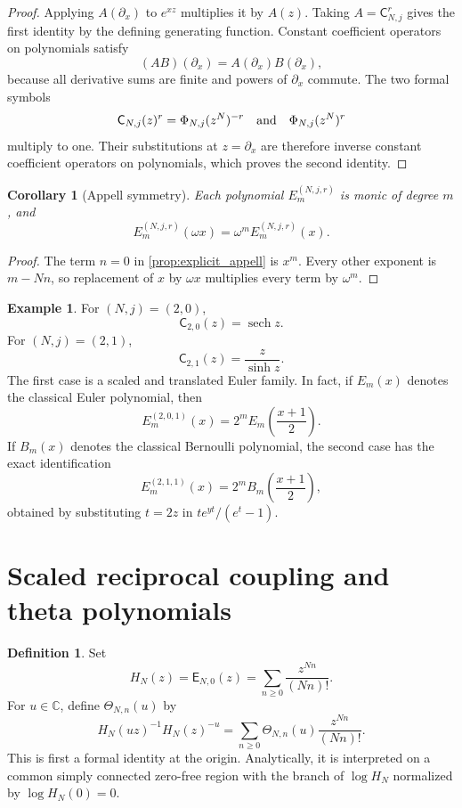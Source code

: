 \documentclass[11pt]{article}
\newtheorem{corollary}[corollary]{Corollary}
\theoremstyle{definition}
\newtheorem{definition}[definition]{Definition}
\newtheorem{example}[example]{Example}
\theoremstyle{remark}
\newcommand{\CC}{\mathbb C}
\newcommand{\Efun}{\mathsf E}
\newcommand{\Cfun}{\mathsf C}
\newcommand{\Thetafun}{\mathsf\Theta}
\newcommand{\sech}{\operatorname{sech}}
\begin{document}
\begin{proof}
Applying $A(\partial_x)$ to $e^{xz}$ multiplies it by $A(z)$.  Taking
$A=\Cfun_{N,j}^r$ gives the first identity by the defining generating
function.  Constant coefficient operators on polynomials satisfy
\[
(AB)(\partial_x)=A(\partial_x)B(\partial_x),
\]
because all derivative sums are finite and powers of $\partial_x$
commute.  The two formal symbols
\[
\Cfun_{N,j}(z)^r=\Phi_{N,j}(z^N)^{-r}
\quad\hbox{and}\quad
\Phi_{N,j}(z^N)^r
\]
multiply to one.  Their substitutions at $z=\partial_x$ are therefore
inverse constant coefficient operators on polynomials, which proves
the second identity.
\end{proof}


\begin{corollary}[Appell symmetry]\label{cor:appell_symmetry}
Each polynomial $E_m^{(N,j,r)}$ is monic of degree $m$, and
\[
E_m^{(N,j,r)}(\omega x)
=
\omega^mE_m^{(N,j,r)}(x).
\]
\end{corollary}

\begin{proof}
The term $n=0$ in \cref{prop:explicit_appell} is $x^m$.  Every other exponent is $m-Nn$, so replacement of $x$ by $\omega x$ multiplies every term by $\omega^m$.
\end{proof}

\begin{example}\label{ex:euler_boundaries}
For $(N,j)=(2,0)$,
\[
\Cfun_{2,0}(z)=\sech z.
\]
For $(N,j)=(2,1)$,
\[
\Cfun_{2,1}(z)=\frac z{\sinh z}.
\]
The first case is a scaled and translated Euler family.  In fact, if $E_m(x)$ denotes the classical Euler polynomial, then
\[
E_m^{(2,0,1)}(x)
=
2^mE_m\left(\frac{x+1}{2}\right).
\]
If $B_m(x)$ denotes the classical Bernoulli polynomial, the second case has
the exact identification
\[
E_m^{(2,1,1)}(x)
=
2^mB_m\left(\frac{x+1}{2}\right),
\]
obtained by substituting $t=2z$ in
$t e^{yt}/(e^t-1)$.
\end{example}

\section{Scaled reciprocal coupling and theta polynomials}\label{sec:theta}

\begin{definition}\label{def:unsigned_denominator}
Set
\[
H_N(z)=\Efun_{N,0}(z)
=
\sum_{n\geq0}\frac{z^{Nn}}{(Nn)!}.
\]
For $u\in\CC$, define $\Thetafun_{N,n}(u)$ by
\[
H_N(uz)^{-1}H_N(z)^{-u}
=
\sum_{n\geq0}\Thetafun_{N,n}(u)\frac{z^{Nn}}{(Nn)!}.
\]
This is first a formal identity at the origin.  Analytically, it is interpreted
on a common simply connected zero-free region with the branch of
$\log H_N$ normalized by $\log H_N(0)=0$.
\end{definition}
\end{document}
